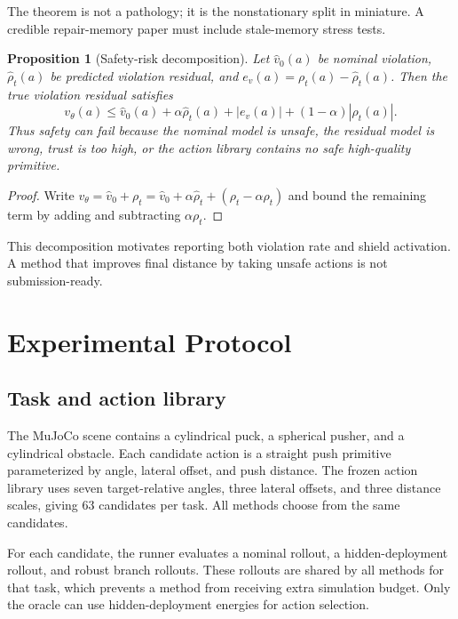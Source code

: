 \documentclass{article}
\newtheorem{proposition}{Proposition}
\begin{document}
The theorem is not a pathology; it is the nonstationary split in miniature. A credible repair-memory paper must include stale-memory stress tests.

\begin{proposition}[Safety-risk decomposition]
Let $\hat v_0(a)$ be nominal violation, $\hat \rho_t(a)$ be predicted violation residual, and $e_v(a)=\rho_t(a)-\hat\rho_t(a)$. Then the true violation residual satisfies
\begin{equation}
v_\theta(a) \le \hat v_0(a)+\alpha\hat\rho_t(a)+|e_v(a)|+(1-\alpha)|\rho_t(a)|.
\end{equation}
Thus safety can fail because the nominal model is unsafe, the residual model is wrong, trust is too high, or the action library contains no safe high-quality primitive.
\end{proposition}

\begin{proof}
Write $v_\theta=\hat v_0+\rho_t=\hat v_0+\alpha\hat\rho_t+(\rho_t-\alpha\hat\rho_t)$ and bound the remaining term by adding and subtracting $\alpha\rho_t$.
\end{proof}

This decomposition motivates reporting both violation rate and shield activation. A method that improves final distance by taking unsafe actions is not submission-ready.

\section{Experimental Protocol}

\subsection{Task and action library}

The MuJoCo scene contains a cylindrical puck, a spherical pusher, and a cylindrical obstacle. Each candidate action is a straight push primitive parameterized by angle, lateral offset, and push distance. The frozen action library uses seven target-relative angles, three lateral offsets, and three distance scales, giving 63 candidates per task. All methods choose from the same candidates.

For each candidate, the runner evaluates a nominal rollout, a hidden-deployment rollout, and robust branch rollouts. These rollouts are shared by all methods for that task, which prevents a method from receiving extra simulation budget. Only the oracle can use hidden-deployment energies for action selection.
\end{document}
